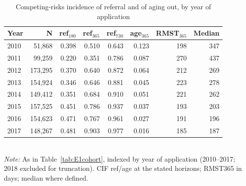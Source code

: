 \begin{table}[htbp]\centering
\caption{Competing-risks incidence of referral and of aging out, by year of application}
\label{tab:E1year}
\footnotesize
\setlength{\tabcolsep}{4pt}
\begin{tabular}{lrrrrrrr}
\toprule
Year & N & ref$_{180}$ & ref$_{365}$ & ref$_{730}$ & age$_{365}$ & RMST$_{365}$ & Median \\
\midrule
2010 & 51,868 & 0.398 & 0.510 & 0.643 & 0.123 & 198 & 347 \\
2011 & 99,259 & 0.220 & 0.351 & 0.786 & 0.087 & 270 & 437 \\
2012 & 173,295 & 0.370 & 0.640 & 0.872 & 0.064 & 212 & 269 \\
2013 & 154,924 & 0.346 & 0.646 & 0.881 & 0.045 & 223 & 278 \\
2014 & 149,412 & 0.351 & 0.684 & 0.910 & 0.051 & 221 & 262 \\
2015 & 157,525 & 0.451 & 0.786 & 0.937 & 0.037 & 193 & 203 \\
2016 & 154,623 & 0.471 & 0.767 & 0.961 & 0.027 & 191 & 196 \\
2017 & 148,267 & 0.481 & 0.903 & 0.977 & 0.016 & 185 & 187 \\
\bottomrule
\end{tabular}
\\[3pt]{\footnotesize \textit{Note:} As in Table~\ref{tab:E1cohort}, indexed by year of application (2010--2017; 2018 excluded for truncation). CIF ref/age at the stated horizons; RMST365 in days; median where defined.}
\end{table}
